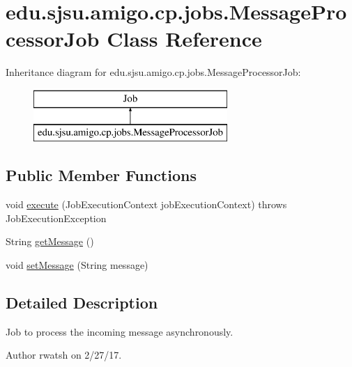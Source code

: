 \hypertarget{classedu_1_1sjsu_1_1amigo_1_1cp_1_1jobs_1_1_message_processor_job}{}\section{edu.\+sjsu.\+amigo.\+cp.\+jobs.\+Message\+Processor\+Job Class Reference}
\label{classedu_1_1sjsu_1_1amigo_1_1cp_1_1jobs_1_1_message_processor_job}
Inheritance diagram for edu.\+sjsu.\+amigo.\+cp.\+jobs.\+Message\+Processor\+Job\+:\begin{figure}[H]
\begin{center}
\leavevmode
\includegraphics[height=2.000000cm]{classedu_1_1sjsu_1_1amigo_1_1cp_1_1jobs_1_1_message_processor_job}
\end{center}
\end{figure}
\subsection*{Public Member Functions}
\begin{DoxyCompactItemize}
\item 
void \hyperlink{classedu_1_1sjsu_1_1amigo_1_1cp_1_1jobs_1_1_message_processor_job_a9801850c707e7073c39593116fa8c717}{execute} (Job\+Execution\+Context job\+Execution\+Context)  throws Job\+Execution\+Exception 
\item 
String \hyperlink{classedu_1_1sjsu_1_1amigo_1_1cp_1_1jobs_1_1_message_processor_job_af7ee13cbb8a7c4140b27aa997f27281f}{get\+Message} ()
\item 
void \hyperlink{classedu_1_1sjsu_1_1amigo_1_1cp_1_1jobs_1_1_message_processor_job_a42d759558f2fa32f7e42eb3693004dba}{set\+Message} (String message)
\end{DoxyCompactItemize}


\subsection{Detailed Description}
Job to process the incoming message asynchronously.

\begin{DoxyAuthor}{Author}
rwatsh on 2/27/17. 
\end{DoxyAuthor}



